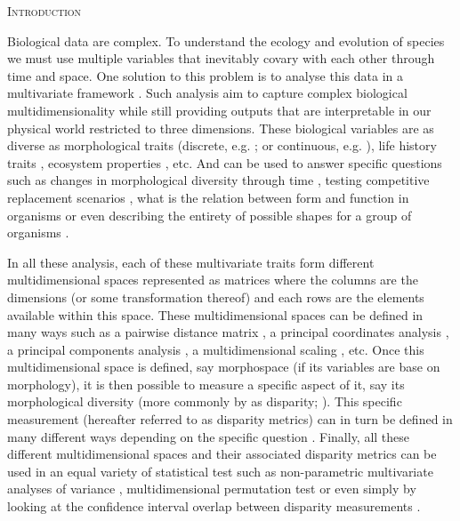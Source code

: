 \documentclass[12pt,letterpaper]{article}
\renewcommand{\section}[1]{%
\bigskip
\begin{center}
\begin{Large}
\normalfont\scshape #1
\medskip
\end{Large}
\end{center}}
\begin{document}
\vspace{1.5in}

\newpage 

%
%

\section{Introduction}

Biological data are complex.
To understand the ecology and evolution of species we must use multiple variables that inevitably covary with each other through time and space.
One solution to this problem is to analyse this data in a multivariate framework \citep[e.g.][]{price2015predation,diaz2016global}.
Such analysis aim to capture complex biological multidimensionality while still providing outputs that are interpretable in our physical world restricted to three dimensions.
These biological variables are as diverse as morphological traits (discrete, e.g. \citealt{brusattedinosaur2012}; or continuous, e.g. \citealt{price2015predation}), life history traits \citep[e.g.][]{diaz2016global}, ecosystem properties \citep[e.g.][]{DonohueDim}, etc.
And can be used to answer specific questions such as changes in morphological diversity through time \citep{Close2015}, testing competitive replacement scenarios \citep{Brusatte12092008}, what is the relation between form and function in organisms \citep{diaz2016global} or even describing the entirety of possible shapes for a group of organisms \citep{raup1966geometric}.

In all these analysis, each of these multivariate traits form different multidimensional spaces represented as matrices where the columns are the dimensions (or some transformation thereof) and each rows are the elements available within this space.
These multidimensional spaces can be defined in many ways such as a pairwise distance matrix \citep{Close2015}, a principal coordinates analysis \citep[PCO;][]{Brusatte12092008}, a principal components analysis \citep[PCA;][]{zelditch2012geometric}, a multidimensional scaling \citep[MDS;][]{DonohueDim}, etc.
Once this multidimensional space is defined, say morphospace (if its variables are base on morphology), it is then possible to measure a specific aspect of it, say its morphological diversity (more commonly by as disparity; \citealt{Hopkins2017}).
This specific measurement (hereafter referred to as disparity metrics) can in turn be defined in many different ways depending on the specific question \citep[e.g.][or combinations thereof]{Wills2001,Ciampaglio2001,foth2012different,DonohueDim,Hughes20082013,finlay2015morphological,Close2015}.
Finally, all these different multidimensional spaces and their associated disparity metrics can be used in an equal variety of statistical test such as non-parametric multivariate analyses of variance \citep[e.g.][]{Brusatte12092008}, multidimensional permutation test \citep[e.g.][]{diaz2016global} or even simply by looking at the confidence interval overlap between disparity measurements \citep[e.g.][]{halliday2016eutherian}.
\end{document}
